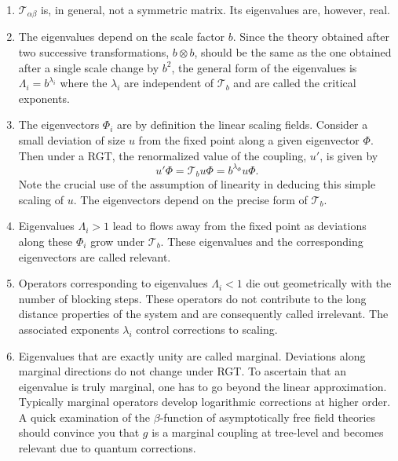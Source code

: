 \begin{enumerate}
\item $\mathcal{T}_{\alpha\beta}$ is, in general, not a symmetric
  matrix.  Its eigenvalues are, however, real.

\item The eigenvalues depend on the scale factor $b$.  Since the theory
  obtained after two successive transformations, $b \otimes b$, should
  be the same as the one obtained after a single scale change by $b^2$,
  the general form of the eigenvalues is $\Lambda_i = b^{\lambda_i}$
  where the $\lambda_i$ are independent of $\mathcal{T}_b$ and are
  called the critical exponents.

\item The eigenvectors $\Phi_i$ are by definition the linear scaling
  fields.  Consider a small deviation of size $u$ from the fixed point
  along a given eigenvector $\Phi$.  Then under a RGT, the renormalized
  value of the coupling, $u'$, is given by
  \begin{equation}
  u'\Phi = \mathcal{T}_b u\Phi = b^{\lambda_\Phi}u\Phi.
  \label{eq:ltmd}
  \end{equation}
  Note the crucial use of the assumption of linearity in deducing this
  simple scaling of $u$.  The eigenvectors depend on the precise form of
  $\mathcal{T}_b$.

\item Eigenvalues $\Lambda_i > 1$ lead to flows away from the fixed
  point as deviations along these $\Phi_i$ grow under $\mathcal{T}_b$.
  These eigenvalues and the corresponding eigenvectors are called
  relevant.

\item Operators corresponding to eigenvalues $\Lambda_i < 1$ die out
  geometrically with the number of blocking steps.  These operators do
  not contribute to the long distance properties of the system and are
  consequently called irrelevant.  The associated exponents $\lambda_i$
  control corrections to scaling.

\item Eigenvalues that are exactly unity are called marginal.
  Deviations along marginal directions do not change under RGT.  To
  ascertain that an eigenvalue is truly marginal, one has to go beyond
  the linear approximation.  Typically marginal operators develop
  logarithmic corrections at higher order.  A quick examination of the
  $\beta$-function of asymptotically free field theories should convince
  you that $g$ is a marginal coupling at tree-level and becomes relevant
  due to quantum corrections.


\end{enumerate}
